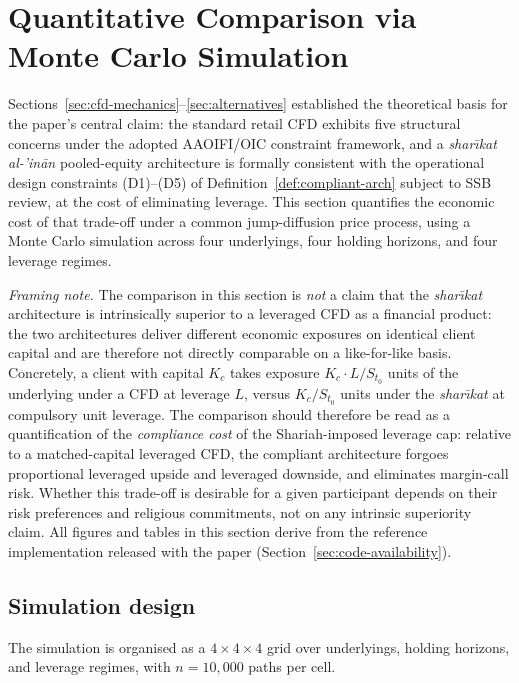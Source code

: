 \documentclass[preprint,12pt,authoryear]{elsarticle}
\theoremstyle{definition}
\begin{document}
\section{Quantitative Comparison via Monte Carlo Simulation}
\label{sec:simulation}

Sections~\ref{sec:cfd-mechanics}--\ref{sec:alternatives} established
the theoretical basis for the paper's central claim: the standard
retail CFD exhibits five structural concerns under the adopted
AAOIFI/OIC constraint framework, and a
\emph{shar\={\i}kat al-'in\={a}n} pooled-equity architecture is
formally consistent with the operational design constraints
(D1)--(D5) of Definition~\ref{def:compliant-arch} subject to SSB
review, at the cost of eliminating leverage. This section
quantifies the economic cost of that trade-off under a common
jump-diffusion price process, using a Monte Carlo simulation
across four underlyings, four holding horizons, and four leverage
regimes.

\emph{Framing note.} The comparison in this section is
\emph{not} a claim that the \emph{shar\={\i}kat} architecture is
intrinsically superior to a leveraged CFD as a financial product:
the two architectures deliver different economic exposures on
identical client capital and are therefore not directly comparable
on a like-for-like basis. Concretely, a client with capital $K_c$
takes exposure $K_c \cdot L / S_{t_0}$ units of the underlying
under a CFD at leverage $L$, versus $K_c / S_{t_0}$ units under the
\emph{shar\={\i}kat} at compulsory unit leverage. The comparison
should therefore be read as a quantification of the
\emph{compliance cost} of the Shariah-imposed leverage cap:
relative to a matched-capital leveraged CFD, the compliant
architecture forgoes proportional leveraged upside and leveraged
downside, and eliminates margin-call risk. Whether this trade-off
is desirable for a given participant depends on their risk
preferences and religious commitments, not on any intrinsic
superiority claim. All figures and tables in this section derive
from
the reference implementation released with the paper
(Section~\ref{sec:code-availability}).

\subsection{Simulation design}
\label{sec:sim-design}

The simulation is organised as a $4 \times 4 \times 4$ grid over
underlyings, holding horizons, and leverage regimes, with
$n = 10{,}000$ paths per cell.
\end{document}
